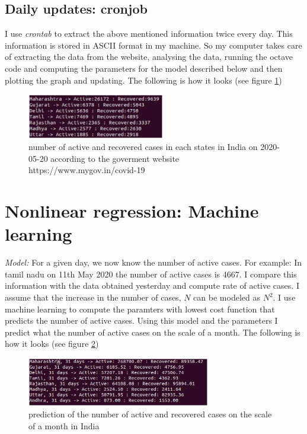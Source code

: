 \documentclass[twocolumn]{article}
\begin{document}
\subsection{Daily updates: cronjob}
I use {\it crontab} to extract the above mentioned information twice every day. This information is stored in ASCII format in my machine. So my computer takes care of extracting the data from the website, analysing the data, running the octave code and computing the parameters for the model described below and then plotting the graph and updating. The following is how it looks (see figure \ref{fig:givendata})\\
		\begin{figure}[htbp]
                \centering
                \includegraphics[clip=true,trim=0cm 0cm 0cm 0cm,width=6cm]{data_covid19.ps}
		\caption{number of active and recovered cases in each states in India on 2020-05-20 according to the goverment website  https://www.mygov.in/covid-19}
                \label{fig:givendata}
                \end{figure}
\section{Nonlinear regression: Machine learning}
{\it Model:} For a given day, we now know the number of active cases. For example: In tamil nadu on 11th May 2020 the number of active cases is 4667. I compare this information with the data obtained yesterday and compute rate of active cases. I assume that the increase in the number of cases, $N$ can be modeled as $N^2$. I use machine learning to compute the paramters with lowest cost function that predicts the number of active cases. Using this model and the parameters I predict what the number of active cases on the scale of a month.
The following is how it looks (see figure \ref{fig:prediction})\\
		\begin{figure}[htbp]
                \centering
                \includegraphics[clip=true,trim=0cm 0cm 0cm 0cm,width=8cm]{predict_covid19.ps}
		\caption{prediction of the number of active and recovered cases on the scale of a month in India}
                \label{fig:prediction}
                \end{figure}
\end{document}
